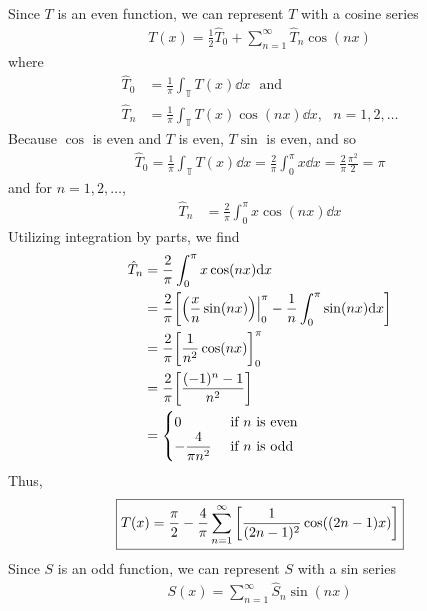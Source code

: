 \documentclass[paper=a4, fontsize=11pt]{scrartcl} %
\theoremstyle{plain}
\numberwithin{equation}{section} %
\numberwithin{figure}{section} %
\numberwithin{table}{section} %
\begin{document}
\begin{enumerate}[\bf (a)]
        Since $T$ is an even function, we can represent $T$ with a cosine series
        \begin{align*}
            T(x) = \frac{1}{2}\hat{T}_0 + \sum_{n=1}^\infty \hat{T}_n\cos(n x)
        \end{align*}
        where
        \begin{align*}
            \hat{T}_0 &= \frac{1}{\pi}\int_\mathbb{T} T(x) \dd x\ \ \ \text{and}\\
            \hat{T}_n &= \frac{1}{\pi}\int_\mathbb{T} T(x) \cos (nx) \dd x,\ \ \ n = 1, 2, \dots
        \end{align*}
        Because $\cos$ is even and $T$ is even, $T \sin$ is even, and so
        \begin{align*}
            \hat{T}_0 = \frac{1}{\pi}\int_\mathbb{T} T(x) \dd x = \frac{2}{\pi}\int_0^\pi x \dd x = \frac{2}{\pi}\frac{\pi^2}{2} = \pi
        \end{align*}
        and for $n = 1, 2, \dots$,
        \begin{align*}
            \hat{T}_n &= \frac{2}{\pi}\int_0^\pi x\cos(nx) \dd x
        \end{align*}
        Utilizing integration by parts, we find
        \begin{align*}
            \hat{T}_n &= \frac{2}{\pi}\int_0^\pi x \cos (nx) \dd x \\
            &= \frac{2}{\pi}\qty[\qty(\frac{x}{n}\sin (nx))\Big|_0^\pi -\frac{1}{n}\int_0^\pi \sin(nx)\dd x] \\
            &= \frac{2}{\pi}\qty[\frac{1}{n^2}\cos (nx)]_0^\pi \\
            &= \frac{2}{\pi}\qty[\frac{(-1)^n - 1}{n^2}] \\
            &= \begin{cases}
                0 & \text{ if $n$ is even} \\
                -\dfrac{4}{\pi n^2} & \text{ if $n$ is odd}
            \end{cases}
        \end{align*}
        Thus,
        \begin{align*}
            \boxed{T(x) = \frac{\pi}{2} - \frac{4}{\pi}\sum_{n=1}^\infty \qty[\frac{1}{(2n-1)^2}\cos((2n-1)x)]}
        \end{align*}
        Since $S$ is an odd function, we can represent $S$ with a sin series
        \begin{align*}
            S(x) = \sum_{n=1}^\infty \hat{S}_n \sin(nx)
        \end{align*}

\end{enumerate}
\end{document}
